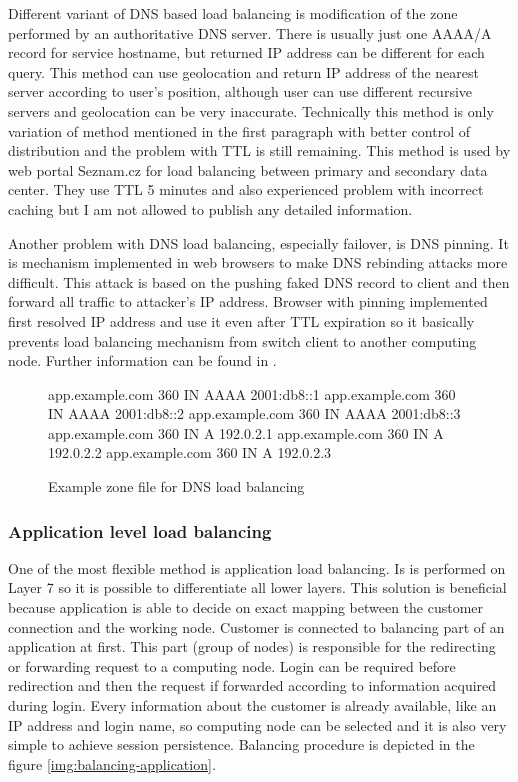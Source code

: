 Different variant of \Ac{DNS} based load balancing is modification of the zone performed by an authoritative \Ac{DNS} server. There is usually just one AAAA/A record for service hostname, but returned \Ac{IP} address can be different for each query. This method can use geolocation and return \Ac{IP} address of the nearest server according to user's position, although user can use different recursive servers and geolocation can be very inaccurate. Technically this method is only variation of method mentioned in the first paragraph with better control of distribution and the problem with \Ac{TTL} is still remaining. This method is used by web portal Seznam.cz for load balancing between primary and secondary data center. They use \Ac{TTL} 5 minutes and also experienced problem with incorrect caching but I am not allowed to publish any detailed information.

Another problem with DNS load balancing, especially failover, is \Ac{DNS} pinning. It is mechanism implemented in web browsers to make \Ac{DNS} rebinding attacks more difficult. This attack is based on the pushing faked \Ac{DNS} record to client and then forward all traffic to attacker's \Ac{IP} address. Browser with pinning implemented  first resolved \Ac{IP} address and use it even after \Ac{TTL} expiration so it basically prevents load balancing mechanism from switch client to another computing node. Further information can be found in \cite{dns-pinning}.

\begin{figure}[htb]
\caption{Example zone file for DNS load balancing}
\label{code:zone}
\begin{verbatimtab}
app.example.com	360	IN	AAAA	2001:db8::1
app.example.com	360	IN	AAAA	2001:db8::2
app.example.com	360	IN	AAAA	2001:db8::3
app.example.com	360	IN	A	192.0.2.1
app.example.com	360	IN	A	192.0.2.2
app.example.com	360	IN	A	192.0.2.3
\end{verbatimtab}
\end{figure}

\subsubsection{Application level load balancing}
One of the most flexible method is application load balancing. Is is performed on Layer 7 so it is possible to differentiate all lower layers. This solution is beneficial because application is able to decide on exact mapping between the customer connection and the working node. 
Customer is connected to balancing part of an application at first. This part (group of nodes) is responsible for the redirecting or forwarding request to a computing node. Login can be required before redirection and then the request if forwarded according to information acquired during login. Every information about the customer is already available, like an \Ac{IP} address and login name, so computing node can be selected and it is also very simple to achieve session persistence. Balancing procedure is depicted in the figure \ref{img:balancing-application}.

